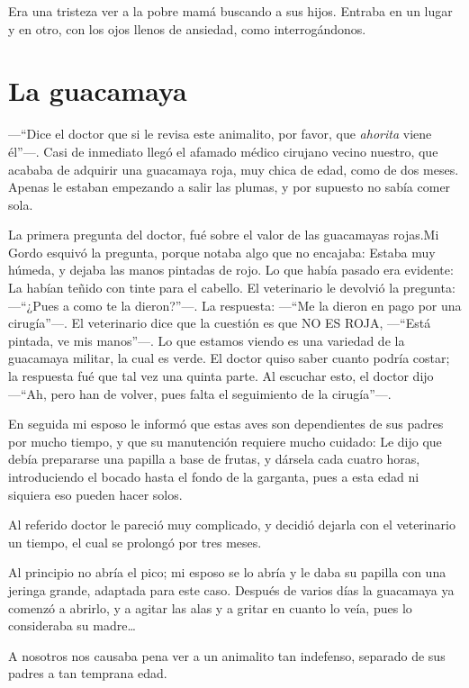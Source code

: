\documentclass[letterpaper, 12pt]{book}
\begin{document}
Era una tristeza ver a la pobre mamá buscando a sus hijos. Entraba en un lugar y en otro, con los ojos llenos de ansiedad, como interrogándonos.

\chapter{La guacamaya}

---``Dice el doctor que si le revisa este animalito, por favor, que \textit{ahorita} viene él''---. Casi de inmediato llegó el afamado médico cirujano vecino nuestro, que acababa de adquirir una guacamaya roja, muy chica de edad, como de dos meses. Apenas le estaban empezando a salir las plumas, y por supuesto no sabía comer sola. 

La primera pregunta del doctor, fué sobre el valor de las guacamayas rojas.Mi Gordo esquivó la pregunta, porque notaba algo que no encajaba: Estaba muy húmeda, y dejaba las manos pintadas de rojo. Lo que había pasado era evidente: La habían teñido con tinte para el cabello. El veterinario le devolvió la pregunta: ---``¿Pues a como te la dieron?''---. La respuesta: ---``Me la dieron en pago por una cirugía''---. El veterinario dice que la cuestión es que NO ES ROJA, ---``Está pintada, ve mis manos''---. Lo que estamos viendo es una variedad de la guacamaya militar, la cual es verde. El doctor quiso saber cuanto podría costar; la respuesta fué que tal vez una quinta parte. Al escuchar esto, el doctor dijo ---``Ah, pero han de volver, pues falta el seguimiento de la cirugía''---.

En seguida mi esposo le informó que estas aves son dependientes de sus padres por mucho tiempo, y que su manutención requiere mucho cuidado: Le dijo que debía prepararse una papilla a base de frutas, y dársela cada cuatro horas, introduciendo el bocado hasta el fondo de la garganta, pues a esta edad ni siquiera eso pueden hacer solos.

Al referido doctor le pareció muy complicado, y decidió dejarla con el veterinario un tiempo, el cual se prolongó por tres meses. 

Al principio no abría el pico; mi esposo se lo abría y le daba su papilla con una jeringa grande, adaptada para este caso. Después de varios días la guacamaya ya comenzó a abrirlo, y a agitar las alas y a gritar en cuanto lo veía, pues lo consideraba su madre\ldots

A nosotros nos causaba pena ver a un animalito tan indefenso, separado de sus padres a tan temprana edad. 
\end{document}
